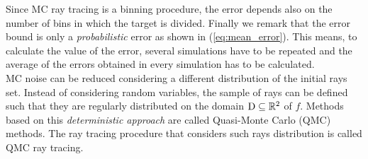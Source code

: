 Since MC ray tracing is a binning procedure, the error depends also on the number of bins in which the target is divided. Finally we remark that the error bound is only a \emph{probabilistic} error as shown in (\ref{eq:mean_error}). This means, to calculate the value of the error, several simulations have to be repeated and the average of the errors obtained in every simulation has to be calculated. \\ \indent 
MC noise can be reduced considering a different distribution of the initial rays set.
Instead of considering random variables, the sample of rays can be defined such that they are regularly distributed on the domain $\textup{D}\subseteq\mathbb{R}^2$ of $f$. Methods based on this \textit{deterministic approach} are called Quasi-Monte Carlo (QMC) methods. The ray tracing procedure that considers such rays distribution is called QMC ray tracing.

